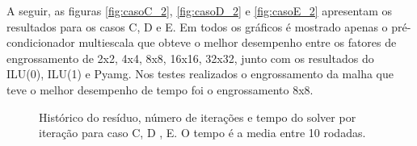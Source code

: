 A seguir, as figuras \ref{fig:casoC_2}, \ref{fig:casoD_2} e \ref{fig:casoE_2} apresentam os resultados para os casos C, D e E. 
Em todos os gráficos é mostrado apenas o pré-condicionador multiescala que obteve o melhor desempenho entre os fatores de engrossamento de 2x2, 4x4, 8x8, 16x16, 32x32,  junto com os resultados do ILU(0), ILU(1) e Pyamg. Nos testes realizados o engrossamento da malha que teve o melhor desempenho de tempo foi o engrossamento 8x8.




\begin{figure}[h]
\center
{}


\qquad
{}

\caption{ Histórico do resíduo, número de iterações e tempo do solver por iteração para caso C, D , E. O tempo é a media entre 10 rodadas. }

\label{fig:resultadosCDE}
\end{figure}

